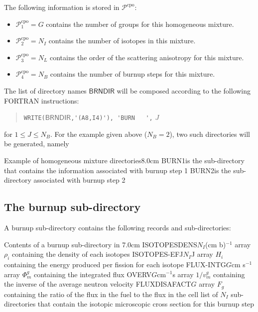 The following information is stored in $\mathcal{P}^{\text{cpo}}$:

\begin{itemize}
\item $\mathcal{P}^{\text{cpo}}_{1}=G$ contains the number of groups for this homogeneous mixture.
\item $\mathcal{P}^{\text{cpo}}_{2}=N_{I}$ contains the number of isotopes in this mixture.
\item $\mathcal{P}^{\text{cpo}}_{3}=N_{L}$ contains the order of the scattering anisotropy for this mixture.
\item $\mathcal{P}^{\text{cpo}}_{4}=N_{B}$ contains the number of burnup steps for this mixture.
\end{itemize}

The list of directory  names $\mathsf{BRNDIR}$ will be composed according to the following
FORTRAN instructions:
\begin{quote}
\verb|WRITE(|$\mathsf{BRNDIR}$\verb|,'(A8,I4)'), 'BURN   ',| $J$
\end{quote}
  for $1\leq J \leq N_{B}$. For the example given above ($N_{B}=2$), two such directories will be
generated, namely

\begin{DescriptionEnregistrement}{Example of homogeneous mixture directories}{8.0cm}
\DirEnr
  {BURN1}{is the sub-directory that contains the information associated with
   burnup step 1}
\DirEnr
  {BURN2}{is the sub-directory associated with burnup step 2}
\end{DescriptionEnregistrement}

\subsection{The burnup sub-directory}\label{sect:cpodirburnup}

A burnup sub-directory contains the following records and sub-directories:

\begin{DescriptionEnregistrement}{Contents of a burnup sub-directory in }{7.0cm}
\RealEnr
  {ISOTOPESDENS}{$N_{I}$}{(cm b)$^{-1}$}
  {array $\rho_{i}$ containing the density of each isotopes}
\RealEnr
  {ISOTOPES-EFJ}{$N_{I}$}{J}
  {array $H_{i}$ containing the energy produced per fission for each isotope}
\RealEnr
  {FLUX-INTG}{$G$}{cm s$^{-1}$}  
  {array $\Phi_{m}^{g}$ containing the integrated flux}
\RealEnr
  {OVERV}{$G$}{cm$^{-1}$s}  
  {array $1/v_{m}^{g}$ containing the inverse of the average neutron velocity}
\RealEnr
  {FLUXDISAFACT}{$G$}{}
  {array $F_{g}$ containing the ratio of the flux in the fuel to the flux in the cell}
\DirVar
  {}
  {list of $N_{I}$ sub-directories that contain the isotopic microscopic cross section 
   for this burnup step}
\end{DescriptionEnregistrement}

